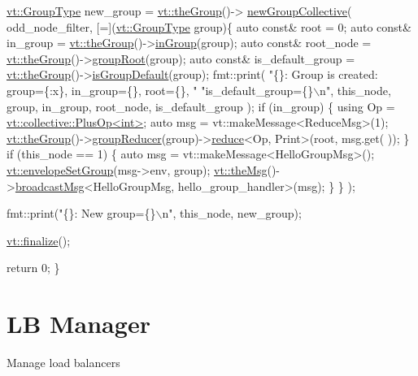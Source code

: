 \begin{DoxyCodeInclude}
  \hyperlink{namespacevt_a27b5e4411c9b6140c49100e050e2f743}{vt::GroupType} new\_group = \hyperlink{namespacevt_a4548473dce44fb654400009e2b2fe64e}{vt::theGroup}()->
      \hyperlink{structvt_1_1group_1_1_group_manager_a92b301d6cf77af7d57ed822c6f044d58}{newGroupCollective}(
    odd\_node\_filter, [=](\hyperlink{namespacevt_a27b5e4411c9b6140c49100e050e2f743}{vt::GroupType} group)\{
      \textcolor{keyword}{auto} \textcolor{keyword}{const}& root = 0;
      \textcolor{keyword}{auto} \textcolor{keyword}{const}& in\_group = \hyperlink{namespacevt_a4548473dce44fb654400009e2b2fe64e}{vt::theGroup}()->\hyperlink{structvt_1_1group_1_1_group_manager_a2204bcd119aaf06e0e356957faad36e6}{inGroup}(group);
      \textcolor{keyword}{auto} \textcolor{keyword}{const}& root\_node = \hyperlink{namespacevt_a4548473dce44fb654400009e2b2fe64e}{vt::theGroup}()->\hyperlink{structvt_1_1group_1_1_group_manager_ab5b8178a37165903c73f9159c9259cf5}{groupRoot}(group);
      \textcolor{keyword}{auto} \textcolor{keyword}{const}& is\_default\_group = \hyperlink{namespacevt_a4548473dce44fb654400009e2b2fe64e}{vt::theGroup}()->\hyperlink{structvt_1_1group_1_1_group_manager_ad4d55f7bcf2aadd97c858b3f11c5d365}{isGroupDefault}(group);
      fmt::print(
        \textcolor{stringliteral}{"\{\}: Group is created: group=\{:x\}, in\_group=\{\}, root=\{\}, "}
        \textcolor{stringliteral}{"is\_default\_group=\{\}\(\backslash\)n"},
        this\_node, group, in\_group, root\_node, is\_default\_group
      );
      \textcolor{keywordflow}{if} (in\_group) \{
        \textcolor{keyword}{using} Op = \hyperlink{structvt_1_1collective_1_1reduce_1_1operators_1_1_plus_op}{vt::collective::PlusOp<int>};
        \textcolor{keyword}{auto} msg = vt::makeMessage<ReduceMsg>(1);
        \hyperlink{namespacevt_a4548473dce44fb654400009e2b2fe64e}{vt::theGroup}()->\hyperlink{structvt_1_1group_1_1_group_manager_a3234e5be55c32ccfb56785265e26b4c6}{groupReducer}(group)->\hyperlink{structvt_1_1collective_1_1reduce_1_1_reduce_adf8bd9748a220a3ed29087c30f8adafc}{reduce}<Op, Print>(root, msg.get(
      ));
      \}
      \textcolor{keywordflow}{if} (this\_node == 1) \{
        \textcolor{keyword}{auto} msg = vt::makeMessage<HelloGroupMsg>();
        \hyperlink{namespacevt_a9f9d4ce6034c0eaaf98bdffd33d0e1c7}{vt::envelopeSetGroup}(msg->env, group);
        \hyperlink{namespacevt_aeafd31f866aeb4dc6fc2f6ee97136350}{vt::theMsg}()->\hyperlink{group__typesafehan_ga344802a09eb0e88006900976d1dfa204}{broadcastMsg}<HelloGroupMsg, hello\_group\_handler>(msg);
      \}
    \}
  );

  fmt::print(\textcolor{stringliteral}{"\{\}: New group=\{\}\(\backslash\)n"}, this\_node, new\_group);

  \hyperlink{namespacevt_a540d90dbd6e97b69f1dcbc9ee9314cff}{vt::finalize}();

  \textcolor{keywordflow}{return} 0;
\}
\end{DoxyCodeInclude}
\hypertarget{lb-manager}{}\section{LB Manager}\label{lb-manager}
Manage load balancers

